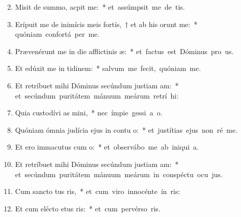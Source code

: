 \begin{flushleft}
\begin{enumerate}[leftmargin=*]
\setcounter{enumi}{1}

\item Misit de summo,  acpit me:~* \mbox{et assúmpsit me de  tis.}

\item Erípuit me de inimícis meis fortís,~† et ab his  orunt me:~* \mbox{quóniam confortá  per me.}

\item Prævenérunt me in die afflictinis æ:~* \mbox{et factus est Dóminus pro us.}

\item Et edúxit me in tidinem:~* \mbox{salvum me fecit, quóniam  me.}

\item Et retríbuet mihi Dóminus secúndum justiam am:~* \mbox{et secúndum puritátem mánuum meárum retrí hi:}

\item Quia custodívi as mini,~* \mbox{nec ímpie gessi a  o.}

\item Quóniam ómnia judícia ejus in contu o:~* \mbox{et justítias ejus non ré  me.}

\item Et ero immacutus cum o:~* \mbox{et observábo me ab iniqui a.}

\item Et retríbuet mihi Dóminus secúndum justiam am:~* \mbox{et secúndum puritátem mánuum meárum in conspéctu ocu jus.}

\item Cum sancto tus ris,~* \mbox{et cum viro innocénte ín ris:}

\item Et cum elécto etus ris:~* \mbox{et cum pervérso ris.}


\end{enumerate}
\end{flushleft}
